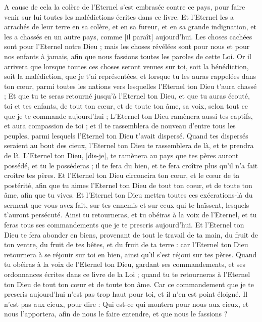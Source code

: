 \begin{multicols}{2}
A cause de cela la colère de l'Eternel s'est embrasée contre ce pays, pour faire venir sur lui toutes les malédictions écrites dans ce livre.
Et l'Eternel les a arrachés de leur terre en sa colère, et en sa fureur, et en sa grande indignation, et les a chassés en un autre pays, comme [il paraît] aujourd'hui.
Les choses cachées sont pour l'Eternel notre Dieu ; mais les choses révélées sont pour nous et pour nos enfants à jamais, afin que nous fassions toutes les paroles de cette Loi.
\VerseOne{}Or il arrivera que lorsque toutes ces choses seront venues sur toi, soit la bénédiction, soit la malédiction, que je t'ai représentées, et lorsque tu les auras rappelées dans ton cœur, parmi toutes les nations vers lesquelles l'Eternel ton Dieu t'aura chassé ;
Et que tu te seras retourné jusqu'à l'Eternel ton Dieu, et que tu auras écouté, toi et tes enfants, de tout ton cœur, et de toute ton âme, sa voix, selon tout ce que je te commande aujourd'hui ;
L'Eternel ton Dieu ramènera aussi tes captifs, et aura compassion de toi ; et il te rassemblera de nouveau d'entre tous les peuples, parmi lesquels l'Eternel ton Dieu t'avait dispersé.
Quand tes dispersés seraient au bout des cieux, l'Eternel ton Dieu te rassemblera de là, et te prendra de là.
L'Eternel ton Dieu, [dis-je], te ramènera au pays que tes pères auront possédé, et tu le posséderas ; il te fera du bien, et te fera croître plus qu'il n'a fait croître tes pères.
Et l'Eternel ton Dieu circoncira ton cœur, et le cœur de ta postérité, afin que tu aimes l'Eternel ton Dieu de tout ton cœur, et de toute ton âme, afin que tu vives.
Et l'Eternel ton Dieu mettra toutes ces exécrations-là du serment que vous avez fait, sur tes ennemis et sur ceux qui te haïssent, lesquels t'auront persécuté.
Ainsi tu retourneras, et tu obéiras à la voix de l'Eternel, et tu feras tous ses commandements que je te prescris aujourd'hui.
Et l'Eternel ton Dieu te fera abonder en biens, provenant de tout le travail de ta main, du fruit de ton ventre, du fruit de tes bêtes, et du fruit de ta terre : car l'Eternel ton Dieu retournera à se réjouir sur toi en bien, ainsi qu'il s'est réjoui sur tes pères.
Quand tu obéiras à la voix de l'Eternel ton Dieu, gardant ses commandements, et ses ordonnances écrites dans ce livre de la Loi ; quand tu te retourneras à l'Eternel ton Dieu de tout ton cœur et de toute ton âme.
Car ce commandement que je te prescris aujourd'hui n'est pas trop haut pour toi, et il n'en est point éloigné.
Il n'est pas aux cieux, pour dire : Qui est-ce qui montera pour nous aux cieux, et nous l'apportera, afin de nous le faire entendre, et que nous le fassions ?

\end{multicols}
